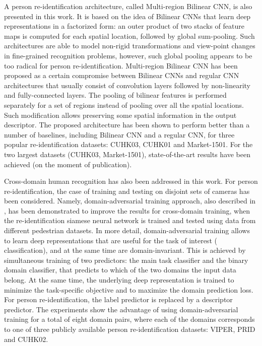 A person re-identification architecture, called Multi-region Bilinear CNN, is also presented in this work. It is based on the idea of Bilinear CNNs that learn deep representations in a factorized form: 
an outer product of two stacks of feature maps is computed for each spatial location, followed by global sum-pooling. Such architectures are able to model non-rigid transformations and view-point changes in fine-grained recognition problems, however, such global pooling appears to be too radical for person re-identification. Multi-region Bilinear CNN has been proposed as a certain compromise between Bilinear CNNs and regular CNN architectures that usually consist of convolution layers followed by non-linearity and fully-connected layers. The pooling of bilinear features is performed separately for a set of regions instead of pooling over all the spatial locations. Such modification allows  preserving some spatial information in the output descriptor. The proposed architecture has been shown to perform better than a number of baselines, including Bilinear CNN and a regular CNN, for three popular re-identification datasets: CUHK03, CUHK01 and Market-1501. For the two largest datasets (CUHK03, Market-1501), state-of-the-art results have been achieved (on the moment of publication).

Cross-domain human recognition has also been addressed in this work. For person re-identification, the case of training and testing on disjoint sets of cameras has been considered. Namely, domain-adversarial training approach, also described in , has been demonstrated to improve the results for cross-domain training, \ie{} when the re-identification siamese neural network is trained and tested using data from different pedestrian datasets. In more detail, domain-adversarial training allows to learn deep representations that are useful for the task of interest (\eg{} classification), and at the same time are domain-invariant. This is achieved by simultaneous training of two predictors: the main task classifier and the binary domain classifier, that predicts to which of the two domains the input data belong. At the same time, the underlying deep representation is trained to minimize the task-specific objective and to maximize the domain prediction loss. For person re-identification, the label predictor is replaced by a descriptor predictor. The experiments show the advantage of using domain-adversarial training for a total of eight domain pairs, where each of the domains corresponds to one of three publicly available person re-identification datasets: VIPER, PRID and CUHK02. %

